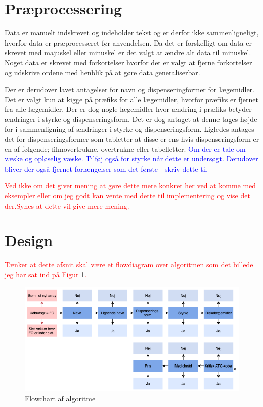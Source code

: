 \section{Præprocessering}
Data er manuelt indskrevet og indeholder tekst og er derfor ikke sammenligneligt, hvorfor data er præprocesseret før anvendelsen. Da det er forskelligt om data er skrevet med majuskel eller minuskel er det valgt at ændre alt data til minuskel. Noget data er skrevet med forkortelser hvorfor det er valgt at fjerne forkortelser og udskrive ordene med henblik på at gøre data generaliserbar. 

Der er derudover lavet antagelser for navn og dispenseringformer for lægemidler. Det er valgt kun at kigge på præfiks for alle lægemidler, hvorfor præfiks er fjernet fra alle lægemidler. Der er dog nogle lægemidler  hvor ændring i præfiks betyder ændringer i styrke og dispenseringsform. Det er dog antaget at denne tages højde for i sammenligning af ændringer i styrke og dispenseringsform. Ligledes antages det for dispenseringsformer som tabletter at disse er ens hvis dispenseringsform er en af følgende; filmovertrukne, overtrukne eller  tabelletter. \textcolor{blue}{Om der er tale om væske og opløselig væske. Tilføj også for styrke når dette er undersøgt. Derudover bliver der også fjernet forlængelser som det første - skriv dette til}

\textcolor{red}{Ved ikke om det giver mening at gøre dette mere konkret her ved at komme med eksempler eller om jeg godt kan vente med dette til implementering og vise det der.Synes at dette vil give mere mening.}

\section{Design}
\textcolor{red}{Tænker at dette afsnit skal være et flowdiagram over algoritmen som det billede jeg har sat ind på Figur  \ref{fig:algoritme}.} 
\begin{figure}[H]\centering	\includegraphics[width=1\textwidth]{billeder/algoritme.png} 
	\caption{Flowchart af algoritme}
	\label{fig:algoritme}  
\end{figure}
\vspace{-0.5cm}


